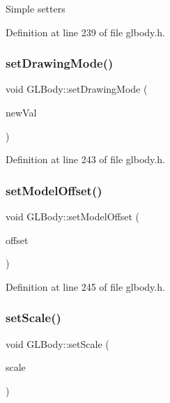 Simple setters 

Definition at line 239 of file glbody.\+h.

\mbox{\label{class_g_l_body_ad13e6bd35c8796d7cb3ddc69eb87f85f}} 
\subsubsection{\texorpdfstring{setDrawingMode()}{setDrawingMode()}}
{\footnotesize\ttfamily void G\+L\+Body\+::set\+Drawing\+Mode (\begin{DoxyParamCaption}\item[{G\+Luint}]{new\+Val }\end{DoxyParamCaption})\hspace{0.3cm}{\ttfamily [inline]}}



Definition at line 243 of file glbody.\+h.

\mbox{\label{class_g_l_body_a44b1012b09a4b74e4edce7542091b97d}} 
\subsubsection{\texorpdfstring{setModelOffset()}{setModelOffset()}}
{\footnotesize\ttfamily void G\+L\+Body\+::set\+Model\+Offset (\begin{DoxyParamCaption}\item[{const Q\+Vector3D \&}]{offset }\end{DoxyParamCaption})\hspace{0.3cm}{\ttfamily [inline]}}



Definition at line 245 of file glbody.\+h.

\mbox{\label{class_g_l_body_af601d382529e294db3fe7c993fff7a37}} 
\subsubsection{\texorpdfstring{setScale()}{setScale()}}
{\footnotesize\ttfamily void G\+L\+Body\+::set\+Scale (\begin{DoxyParamCaption}\item[{float}]{scale }\end{DoxyParamCaption})\hspace{0.3cm}{\ttfamily [inline]}}



